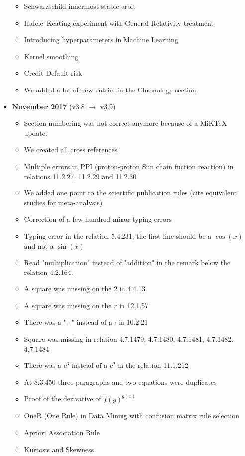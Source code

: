 \documentclass[12pt,a4paper,twoside,openright]{report}
\theoremstyle{definition}
\theoremstyle{itexmp}
\numberwithin{equation}{section}
\begin{document}
\begin{itemize}
\begin{itemize}[noitemsep]
				\item Schwarzschild innermost stable orbit
				\item Hafele–Keating experiment with General Relativity treatment
				\item Introducing hyperparameters in Machine Learning
				\item Kernel smoothing
				\item Credit Default risk
				\item We added a lot of new entries in the Chronology section
			\end{itemize}
		\item \textbf{November 2017} (v3.8 $\rightarrow$ v3.9)
			\begin{itemize}[noitemsep]
				\item Section numbering was not correct anymore because of a MiKTeX update.
				\item We created all cross references
				\item Multiple errors in PPI (proton-proton Sun chain fuction reaction) in relations 11.2.27, 11.2.29 and 11.2.30
				\item We added one point to the scientific publication rules (cite equivalent studies for meta-analysis)
				\item Correction of a few hundred minor typing errors
				\item Typing error in the relation 5.4.231, the first line should be a $\cos(x)$ and not a $\sin(x)$
				\item Read "multiplication" instead of "addition" in the remark below the relation 4.2.164.
				\item A square was missing on the $2$ in 4.4.13.
				\item A square was missing on the $r$ in 12.1.57
				\item There was a "$+$" instead of a $\cdot$ in 10.2.21
				\item Square was missing in relation 4.7.1479, 4.7.1480, 4.7.1481, 4.7.1482. 4.7.1484
				\item There was a $c^3$ instead of a $c^2$ in the relation 11.1.212
				\item At 8.3.450 three paragraphs and two equations were duplicates
				\item Proof of the derivative of $f(g)^{g(x)}$
				\item OneR (One Rule) in Data Mining with confusion matrix rule selection
				\item Apriori Association Rule
				\item Kurtosis and Skewness
			\end{itemize}
	\end{itemize}
\end{document}
